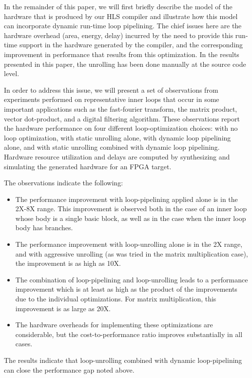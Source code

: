 \documentclass[conference]{IEEEtran}
\begin{document}
In the remainder of this paper, we will first briefly describe the model of
the hardware that is produced by our HLS compiler and illustrate how this model
can incorporate dynamic run-time loop pipelining.  The chief issues here are the
hardware overhead (area, energy, delay) incurred by the need to provide 
this run-time support in the hardware generated by the compiler, and
the corresponding improvement in performance that results from this optimization.
In the results presented in this paper, the unrolling has been done 
manually at the source code level.

In order to address this issue, we will present a set of observations from
experiments performed on representative inner loops that occur in 
some important applications such as the fast-fourier transform, the
matrix product, vector dot-product, and a digital filtering algorithm.
These observations report the hardware performance on four different
loop-optimization choices: with no loop optimization, with static unrolling
alone, with dynamic loop pipelining alone, and with static unrolling combined with
dynamic loop pipelining.  Hardware resource utilization and delays are
computed by synthesizing and simulating the generated hardware for an FPGA target.

The observations indicate the following:
\begin{itemize}
\item The performance improvement with loop-pipelining applied alone is in the
2X-8X range.   This improvement is observed both in the case of an inner
loop whose body is a single basic block, as well as in the case when the
inner loop body has branches.
\item The performance improvement with loop-unrolling alone is in the 
2X range, and with aggressive unrolling (as was tried in the matrix multiplication
case), the improvement is as high as 10X.
\item The combination of loop-pipelining and loop-unrolling leads
to a performance improvement which is at least as high as the
product of the improvements due to the individual optimizations.  
For matrix multiplication, this improvement is as large as 20X.
\item The hardware overheads for implementing these optimizations are considerable,
but the cost-to-performance ratio improves substantially in all cases.
\end{itemize}
The results indicate that loop-unrolling combined with dynamic loop-pipelining
can close the performance gap noted above.
\end{document}
